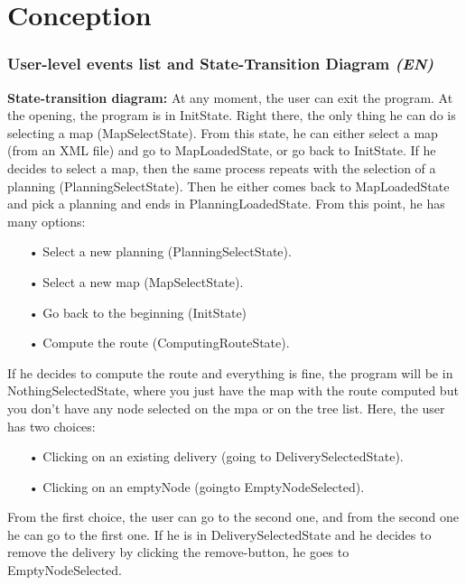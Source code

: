 \documentclass[paper=a4, fontsize=11pt]{report}
\numberwithin{equation}{section}		%
\numberwithin{figure}{section}		%
\numberwithin{table}{section}		%
\renewcommand{\bf}[1]{\textbf{#1}}
\renewcommand{\it}[1]{\textit{#1}}
\newcommand{\Todo}[1]{\todo[inline]{#1}}
\begin{document}
\part{Conception}
\label{part:conception}
\setcounter{section}{0}

\section{User-level events list and State-Transition Diagram \it{(EN)}}
\label{sec:user-level-events-list-and-state-transition-diagram}

\Todo{We should add a comment here}

\bf{State-transition diagram:}
At any moment, the user can exit the program.
At the opening, the program is in InitState. Right there, the only thing he can do is selecting a map (MapSelectState). From this state, he can either select a map (from an XML file) and go to MapLoadedState, or go back to InitState. If he decides to select a map, then the same process repeats with the selection of a planning (PlanningSelectState). Then he either comes back to MapLoadedState and pick a planning and ends in PlanningLoadedState. From this point, he has many options:
\begin{itemize}
  \item[•] Select a new planning (PlanningSelectState).
  \item[•] Select a new map (MapSelectState).
  \item[•] Go back to the beginning (InitState)
  \item[•] Compute the route (ComputingRouteState).
\end{itemize}
If he decides to compute the route and everything is fine, the program will be in NothingSelectedState, where you just have the map with the route computed but you don't have any node selected on the mpa or on the tree list. Here, the user has two choices:
\begin{itemize}
  \item[•] Clicking on an existing delivery (going to DeliverySelectedState).
  \item[•] Clicking on an emptyNode (goingto EmptyNodeSelected).
\end{itemize}
From the first choice, the user can go to the second one, and from the second one he can go to the first one. If he is in DeliverySelectedState and he decides to remove the delivery by clicking the remove-button, he goes to EmptyNodeSelected.
\end{document}
